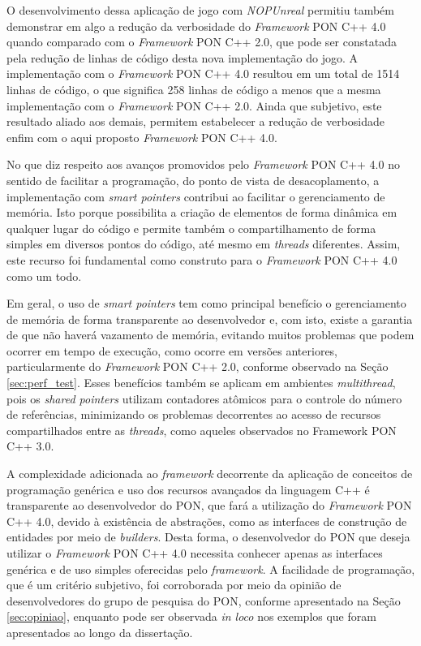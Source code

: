 O desenvolvimento dessa aplicação de jogo com \textit{NOPUnreal} permitiu também
demonstrar em algo a redução da verbosidade do \textit{Framework} PON C++ 4.0
quando comparado com o \textit{Framework} PON C++ 2.0, que pode ser constatada
pela redução de linhas de código desta nova implementação do jogo. A
implementação com o \textit{Framework} PON C++ 4.0 resultou em um total de 1514
linhas de código, o que significa 258 linhas de código a menos que a mesma
implementação com o \textit{Framework} PON C++ 2.0. Ainda que subjetivo, este
resultado aliado aos demais, permitem estabelecer a redução de verbosidade enfim
com o aqui proposto \textit{Framework} PON C++ 4.0.

No que diz respeito aos avanços promovidos pelo \textit{Framework} PON C++ 4.0
no sentido de facilitar a programação, do ponto de vista de desacoplamento, a
implementação com \textit{smart pointers} contribui ao facilitar o gerenciamento
de memória. Isto porque possibilita a criação de elementos de forma dinâmica em
qualquer lugar do código e permite também o compartilhamento de forma simples em
diversos pontos do código, até mesmo em \textit{threads} diferentes. Assim, este
recurso foi fundamental como construto para o \textit{Framework} PON C++ 4.0 como um
todo.

Em geral, o uso de \textit{smart pointers} tem como principal benefício o
gerenciamento de memória de forma transparente ao desenvolvedor e, com isto,
existe a garantia de que não haverá vazamento de memória, evitando muitos
problemas que podem ocorrer em tempo de execução, como ocorre em versões
anteriores, particularmente do \textit{Framework} PON C++ 2.0, conforme
observado na Seção \ref{sec:perf_test}. Esses benefícios também se aplicam em
ambientes \textit{multithread}, pois os \textit{shared pointers} utilizam
contadores atômicos para o controle do número de referências, minimizando os
problemas decorrentes ao acesso de recursos compartilhados entre as
\textit{threads}, como aqueles observados no Framework PON C++ 3.0.

A complexidade adicionada ao \textit{framework} decorrente da aplicação de
conceitos de programação genérica e uso dos recursos avançados da linguagem C++
é transparente ao desenvolvedor do PON, que fará a utilização do
\textit{Framework} PON C++ 4.0, devido à existência de abstrações, como as
interfaces de construção de entidades por meio de \textit{builders}. Desta
forma, o desenvolvedor do PON que deseja utilizar o \textit{Framework} PON C++
4.0 necessita conhecer apenas as interfaces genérica e de uso simples oferecidas
pelo \textit{framework}. A facilidade de programação, que é um critério
subjetivo, foi corroborada por meio da opinião de desenvolvedores do grupo de
pesquisa do PON, conforme apresentado na Seção \ref{sec:opiniao}, enquanto pode
ser observada \textit{in loco} nos exemplos que foram apresentados ao longo da
dissertação.

